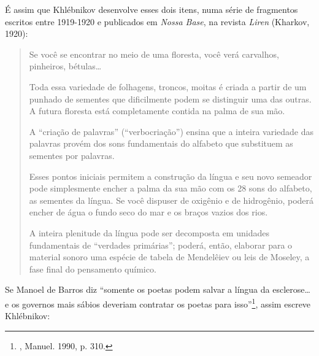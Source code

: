 É assim que Khlébnikov desenvolve esses dois itens, numa série de
fragmentos escritos entre 1919-1920 e publicados em \emph{Nossa Base},
na revista \emph{Liren} (Kharkov, 1920):

\begin{quote}
Se você se encontrar no meio de uma floresta, você verá carvalhos,
pinheiros, bétulas\ldots{}

Toda essa variedade de folhagens, troncos, moitas é criada a partir de
um punhado de sementes que dificilmente podem se distinguir uma das
outras. A futura floresta está completamente contida na palma de sua
mão.

A ``criação de palavras'' (``verbocriação'') ensina que a inteira
variedade das palavras provém dos sons fundamentais do alfabeto que
substituem as sementes por palavras.

Esses pontos iniciais permitem a construção da língua e seu novo
semeador pode simplesmente encher a palma da sua mão com os 28 sons do
alfabeto, as sementes da língua. Se você dispuser de oxigênio e de
hidrogênio, poderá encher de água o fundo seco do mar e os braços vazios
dos rios.

A inteira plenitude da língua pode ser decomposta em unidades
fundamentais de ``verdades primárias''; poderá, então, elaborar para o
material sonoro uma espécie de tabela de Mendelêiev ou leis de Moseley,
a fase final do pensamento químico.
\end{quote}

Se Manoel de Barros diz ``somente os poetas podem salvar a língua da
esclerose\ldots{} e os governos mais sábios deveriam contratar os poetas para
isso''\footnote{, Manuel. 1990, p. 310.}, assim escreve
Khlébnikov:


